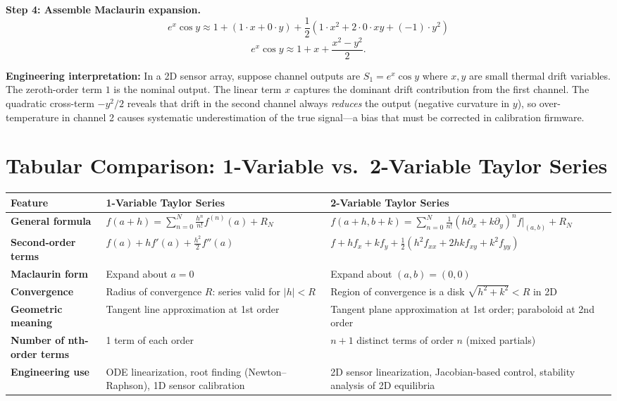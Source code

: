 \documentclass[12pt,a4paper]{article}
\begin{document}
\textbf{Step 4: Assemble Maclaurin expansion.}
\[
  e^{x}\cos y \approx 1 + (1\cdot x + 0\cdot y) + \frac{1}{2}(1\cdot x^{2} + 2\cdot 0 \cdot xy + (-1)\cdot y^{2})
\]
\[
  \boxed{e^{x}\cos y \approx 1 + x + \frac{x^{2}-y^{2}}{2}.}
\]

\textbf{Engineering interpretation:} In a 2D sensor array, suppose channel outputs are \( S_{1} = e^{x}\cos y \) where \( x, y \) are small thermal drift variables. The zeroth-order term \( 1 \) is the nominal output. The linear term \( x \) captures the dominant drift contribution from the first channel. The quadratic cross-term \( -y^{2}/2 \) reveals that drift in the second channel always \emph{reduces} the output (negative curvature in \( y \)), so over-temperature in channel 2 causes systematic underestimation of the true signal---a bias that must be corrected in calibration firmware.

\section{Tabular Comparison: 1-Variable vs.\ 2-Variable Taylor Series}

\begin{center}
\begin{tabular}{>{\bfseries}p{3.2cm} p{5cm} p{5.5cm}}
\toprule
Feature & 1-Variable Taylor Series & 2-Variable Taylor Series \\
\midrule
General formula &
  \( f(a+h) = \displaystyle\sum_{n=0}^{N}\frac{h^n}{n!}f^{(n)}(a) + R_N \) &
  \( f(a+h,b+k) = \displaystyle\sum_{n=0}^{N}\frac{1}{n!}(h\partial_x+k\partial_y)^n f\big|_{(a,b)} + R_N \) \\[8pt]
Second-order terms &
  \( f(a) + hf'(a) + \tfrac{h^2}{2}f''(a) \) &
  \( f + hf_x + kf_y + \tfrac{1}{2}(h^2f_{xx}+2hkf_{xy}+k^2f_{yy}) \) \\[8pt]
Maclaurin form &
  Expand about \( a = 0 \) &
  Expand about \( (a,b)=(0,0) \) \\[8pt]
Convergence &
  Radius of convergence \( R \): series valid for \( |h| < R \) &
  Region of convergence is a disk \( \sqrt{h^2+k^2} < R \) in 2D \\[8pt]
Geometric meaning &
  Tangent line approximation at 1st order &
  Tangent plane approximation at 1st order; paraboloid at 2nd order \\[8pt]
Number of nth-order terms &
  1 term of each order &
  \( n+1 \) distinct terms of order \( n \) (mixed partials) \\[8pt]
Engineering use &
  ODE linearization, root finding (Newton--Raphson), 1D sensor calibration &
  2D sensor linearization, Jacobian-based control, stability analysis of 2D equilibria \\
\bottomrule
\end{tabular}
\end{center}
\end{document}
